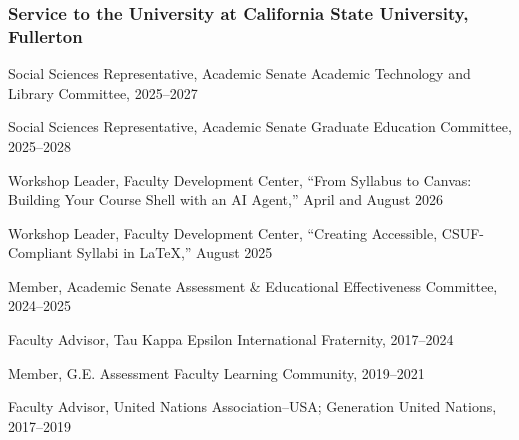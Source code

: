 \documentclass[11pt,letterpaper]{article}
\renewenvironment{itemize}{
  \begin{list}{}{
    \setlength{\leftmargin}{1.5em}
    \setlength{\itemsep}{0.25em}
    \setlength{\parskip}{0pt}
    \setlength{\parsep}{0.25em}
  }
}{
  \end{list}
}
\begin{document}
\subsubsection*{Service to the University at California State University, Fullerton}
\begin{itemize}\leftmargin=2pt\itemindent=-15pt
    \item Social Sciences Representative, Academic Senate Academic Technology and Library Committee, 2025--2027
    \item Social Sciences Representative, Academic Senate Graduate Education Committee, 2025--2028
    \item Workshop Leader, Faculty Development Center, ``From Syllabus to Canvas: Building Your Course Shell with an AI Agent,'' April and August 2026
    \item Workshop Leader, Faculty Development Center, ``Creating Accessible, CSUF-Compliant Syllabi in \LaTeX,'' August 2025
    \item Member, Academic Senate Assessment \& Educational Effectiveness Committee, 2024--2025
    \item Faculty Advisor, Tau Kappa Epsilon International Fraternity, 2017--2024
    \item Member, G.E. Assessment Faculty Learning Community, 2019--2021
    \item Faculty Advisor, United Nations Association--USA; Generation United Nations, 2017--2019
\end{itemize}
\end{document}

